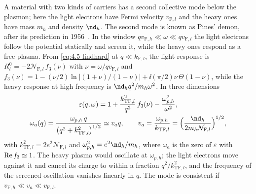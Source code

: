 A material with two kinds of carriers has a second collective mode below the plasmon; here the light electrons have Fermi velocity $v_{\mathrm{F},l}$ and the heavy ones have mass $m_h$ and density $\nd_h$. The second mode is known as Pines' demon, after its prediction in 1956~\cite{pines1956electron}. In the window $qv_{\mathrm{F},h} \ll \omega \ll qv_{\mathrm{F},l}$ the light electrons follow the potential statically and screen it, while the heavy ones respond as a free plasma. From \cref{eq:4.5-lindhard} at $q \ll k_{\mathrm{F},l}$, the light response is $R^0_l = -2\mathcal{N}_{\mathrm{F},l}\,f_3(\nu)$ with $\nu = \omega/qv_{\mathrm{F},l}$ and $f_3(\nu) = 1 - (\nu/2)\ln|(1 + \nu)/(1 - \nu)| + \ii(\pi/2)\nu\,\Theta(1 - \nu)$, while the heavy response at high frequency is $\nd_hq^2/m_h\omega^2$. In three dimensions
\begin{gather}
  \varepsilon(q,\omega) = 1 + \frac{k_{\mathrm{TF},l}^2}{q^2}\,f_3(\nu) - \frac{\omega_{p,h}^2}{\omega^2} , \notag \\
  \omega_a(q) = \frac{\omega_{p,h}\,q}{\bigl(q^2 + k_{\mathrm{TF},l}^2\bigr)^{1/2}} \simeq v_aq ,
  \qquad
  v_a = \frac{\omega_{p,h}}{k_{\mathrm{TF},l}} = \Bigl(\frac{\nd_h}{2m_h\mathcal{N}_{\mathrm{F},l}}\Bigr)^{1/2} ,
  \label{eq:16.2-demon}
\end{gather}
with $k_{\mathrm{TF},l}^2 = 2e^2\mathcal{N}_{\mathrm{F},l}$ and $\omega_{p,h}^2 = e^2\nd_h/m_h$, where $\omega_a$ is the zero of $\varepsilon$ with $\operatorname{Re} f_3 \simeq 1$. The heavy plasma would oscillate at $\omega_{p,h}$; the light electrons move against it and cancel its charge to within a fraction $q^2/k_{\mathrm{TF},l}^2$, and the frequency of the screened oscillation vanishes linearly in $q$. The mode is consistent if $v_{\mathrm{F},h} \ll v_a \ll v_{\mathrm{F},l}$.

